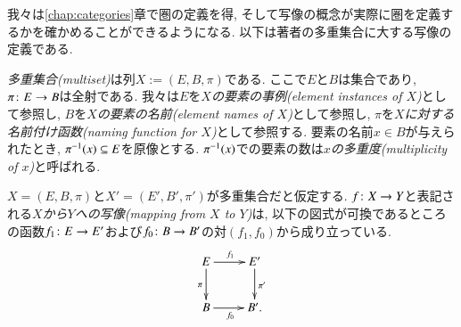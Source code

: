 
我々は\ref{chap:categories}章で圏の定義を得, そして写像の概念が実際に圏を定義するかを確かめることができるようになる. 以下は著者の多重集合に大する写像の定義である.

\begin{definition}\label{def:multiset}


\emph{多重集合(multiset)}は列$X:=(E,B,\pi)$である. ここで$E$と$B$は集合であり, $\pi\colon E\rightarrow B$は全射である. 我々は$E$を\emph{$X$の要素の事例(element instances of $X$)}として参照し, $B$を\emph{$X$の要素の名前(element names of $X$)}として参照し, $\pi$を\emph{$X$に対する名前付け函数(naming function for $X$)}として参照する. 要素の名前$x\in B$が与えられたとき, $\pi^\m1(x)\ss E$を原像とする. $\pi^\m1(x)$での要素の数は\emph{$x$の多重度(multiplicity of $x$)}と呼ばれる.


$X=(E,B,\pi)$と$X'=(E',B',\pi')$が多重集合だと仮定する. $f\colon X\rightarrow Y$と表記される\emph{$X$から$Y$への写像(mapping from $X$ to $Y$)}は, 以下の図式が可換であるところの函数$f_1\colon E\rightarrow E'$および$f_0\colon B\rightarrow B'$の対$(f_1,f_0)$から成り立っている.
\begin{align}\label{dia:multiset map}
\xymatrix{E\ar[r]^{f_1}\ar[d]_{\pi}&E'\ar[d]^{\pi'}\\B\ar[r]_{f_0}&B'.}
\end{align}

\end{definition}

